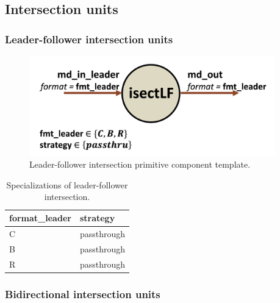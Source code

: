 \subsection{Intersection units}

\subsubsection{Leader-follower intersection units}

\begin{figure}[H]
    \centering
    \includegraphics[width=0.95\textwidth]{figures/isectlf.png}
    \caption{Leader-follower intersection primitive component template.}
    \label{fig:isectlf}
\end{figure}

\begin{table}[H]
\centering
\begin{tabular}{ll}
\toprule
 format\_leader   & strategy    \\
\midrule
 C               & passthrough \\
 B               & passthrough \\
 R               & passthrough \\
\bottomrule
\end{tabular}
\caption{Specializations of leader-follower intersection.}
\label{tab:IntersectionLeaderFollower_specializations}
\end{table}

\subsubsection{Bidirectional intersection units}

